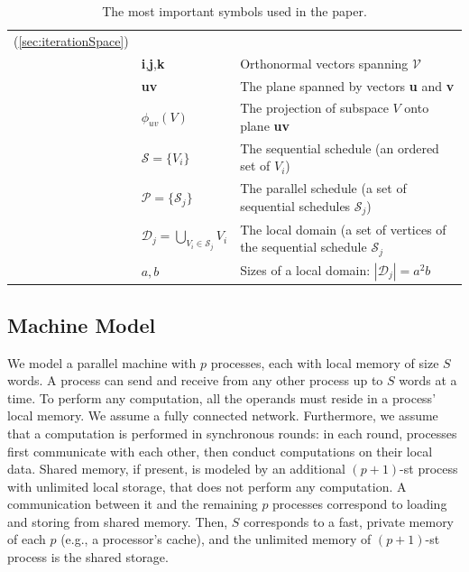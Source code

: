 \documentclass[sigplan,review,anonymous,10pt]{acmart}\settopmatter{printfolios=true,printccs=false,printacmref=false}
\begin{document}
\begin{table}[h]
\begin{tabular}{@{}l|ll@{}}
		(\cref{sec:iterationSpace})\\         
		& \textbf{i},\textbf{j},\textbf{k} & Orthonormal vectors spanning 
		$\mathcal{V}$\\
		& \textbf{uv} & The plane spanned by vectors \textbf{u} and \textbf{v}\\
		& $\phi_{uv}(V)$ & The projection of subspace $V$ onto plane 
		\textbf{uv}\\
		& $\mathcal{S} = \{V_i\}$ & The sequential schedule (an ordered set of 
		 $V_i$) \\ 
		& $\mathcal{P} = \{\mathcal{S}_j\}$ & The parallel schedule (a set of 
		sequential schedules $\mathcal{S}_j$) \\
		& $\mathcal{D}_j = \bigcup_{V_i \in \mathcal{S}_j}V_i $ & The local 
		domain 
		(a set of vertices 
		of the sequential schedule $\mathcal{S}_j$ \\
		& $a,b$ &  Sizes of a local domain: $|\mathcal{D}_j| = a^2b$\\
		
		\bottomrule
	\end{tabular}
	\caption{The most important symbols used in the paper.}
\vspace{-1em}
%
	\label{tab:symbols}
\end{table}
\vspace{-0.5em}


\subsection{Machine Model}
\label{sec:machineModel}

We model a parallel machine with $p$
processes, each with local memory of size $S$ words.
A process can send and receive from any other process up to $S$ words at 
a time.
To perform any computation, all the operands must reside in a process' local 
memory.
We assume a fully connected network. Furthermore, we assume that 
a computation is performed in synchronous rounds: in each round, processes 
first 
communicate with each other, then conduct computations on their local data.
Shared memory, if present, is modeled by an additional $(p+1)$-st process with  
unlimited local storage, that does not perform any computation. A communication 
between it and the remaining $p$ processes correspond to loading and storing 
from shared memory. Then, $S$ corresponds to a fast, private memory of each 
$p$ (e.g., a processor's cache), and the unlimited memory of $(p+1)$-st process 
is the shared storage.
\end{document}
